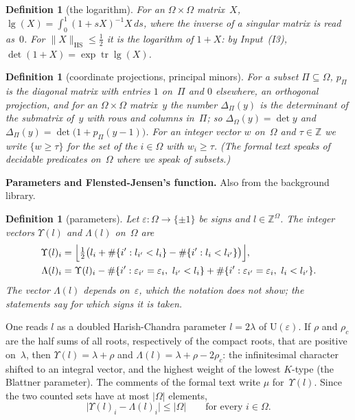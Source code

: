 \documentclass[11pt,a4paper]{article}
\newcommand{\m}[1]{\mbox{$#1$}}        %
\newcommand{\subhead}[1]{\par\addvspace{9pt plus 2pt}\Needspace{4\baselineskip}\noindent\textbf{#1}\enspace\ignorespaces}
\theoremstyle{plainx}
\theoremstyle{uprightx}
\newtheorem{definition}[theorem]{Definition}
\newcommand{\ZZ}{\mathbb{Z}}
\newcommand{\abs}[1]{\lvert #1\rvert}
\newcommand{\bigabs}[1]{\bigl\lvert #1\bigr\rvert}
\newcommand{\hs}[1]{\lVert #1\rVert_{\mathrm{HS}}}
\newcommand{\tr}{\operatorname{tr}}
\newcommand{\Us}[1]{\mathrm{U}(#1)}                      %
\newcommand{\lgo}[1]{\operatorname{lg}(#1)}              %
\newcommand{\cpr}[1]{p_{#1}}                             %
\newcommand{\pmn}[2]{\Delta_{#1}(#2)}                    %
\newcommand{\lowk}[1]{\Lambda(#1)}                       %
\newcommand{\ups}[1]{\Upsilon(#1)}                       %
\newcommand{\inp}[1]{\textup{(I#1)}}
\begin{document}
\begin{definition}[the logarithm]\label{d:lg}
For an \m{\Omega\times\Omega} matrix~$X$, $\lgo{X}=\int_0^1(1+sX)^{-1}X\,ds$, where the inverse of a singular
matrix is read as~$0$. For \m{\hs{X}\le\tfrac12} it is the logarithm of \m{1+X}: by Input~\inp{3},
\m{\det(1+X)=\exp\tr\lgo{X}}.
\end{definition}

\begin{definition}[coordinate projections, principal minors]\label{d:minor}
For a subset \m{\Pi\subseteq\Omega}, $\cpr{\Pi}$ is the diagonal matrix with entries $1$ on~$\Pi$ and $0$
elsewhere, an orthogonal projection, and for an \m{\Omega\times\Omega} matrix~$y$ the number $\pmn{\Pi}{y}$ is the
determinant of the submatrix of~$y$ with rows and columns in~$\Pi$; so \m{\pmn{\Omega}{y}=\det y} and
$\pmn{\Pi}{y}=\det\bigl(1+\cpr{\Pi}(y-1)\bigr)$. For an integer vector $w$ on~$\Omega$ and \m{\tau\in\ZZ} we write
\m{\{w\ge\tau\}} for the set of the \m{i\in\Omega} with \m{w_i\ge\tau}. (The formal text speaks of decidable
predicates on~$\Omega$ where we speak of subsets.)
\end{definition}

\subhead{Parameters and Flensted-Jensen's function.} Also from the background library.

\begin{definition}[parameters]\label{d:param}
Let $\varepsilon\colon\Omega\to\{\pm1\}$ be signs and \m{l\in\ZZ^{\Omega}}. The integer vectors $\ups{l}$ and
$\lowk{l}$ on~$\Omega$ are
\begin{align*}
\ups{l}_i&=\Bigl\lfloor\tfrac12\bigl(l_i+\#\{i':l_{i'}<l_i\}-\#\{i':l_i<l_{i'}\}\bigr)\Bigr\rfloor,\\
\lowk{l}_i&=\ups{l}_i-\#\{i':\varepsilon_{i'}=\varepsilon_i,\ l_{i'}<l_i\}+\#\{i':\varepsilon_{i'}=\varepsilon_i,\ l_i<l_{i'}\}.
\end{align*}
The vector $\lowk{l}$ depends on~$\varepsilon$, which the notation does not show; the statements say for which signs
it is taken.
\end{definition}

One reads $l$ as a doubled Harish-Chandra parameter \m{l=2\lambda} of $\Us{\varepsilon}$. If $\rho$ and $\rho_c$ are
the half sums of all roots, respectively of the compact roots, that are positive on~$\lambda$, then
\m{\ups{l}=\lambda+\rho} and \m{\lowk{l}=\lambda+\rho-2\rho_c}: the infinitesimal character shifted to an
integral vector, and the highest weight of the lowest $K$-type (the Blattner parameter). The comments of the
formal text write $\mu$ for~$\ups{l}$. Since the two counted sets have at most $\abs{\Omega}$ elements,
\begin{equation}\label{e:rhoc}
\bigabs{\ups{l}_i-\lowk{l}_i}\le\abs{\Omega}\qquad\text{for every }i\in\Omega .
\end{equation}
\end{document}
